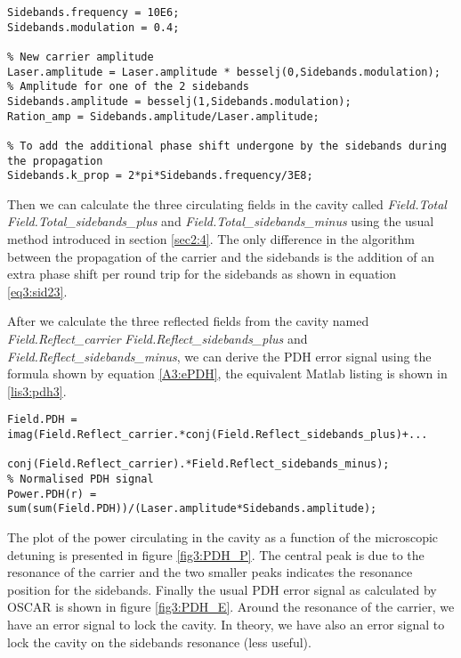 \begin{lstlisting}[float=btp,caption=New variables to define the sidebands frequency and amplitude \label{lis3:SB},frame=lines]
% Frequency of the sidebands in Hertz and modulation index
Sidebands.frequency = 10E6;
Sidebands.modulation = 0.4;

% New carrier amplitude
Laser.amplitude = Laser.amplitude * besselj(0,Sidebands.modulation);
% Amplitude for one of the 2 sidebands
Sidebands.amplitude = besselj(1,Sidebands.modulation);
Ration_amp = Sidebands.amplitude/Laser.amplitude;

% To add the additional phase shift undergone by the sidebands during the propagation
Sidebands.k_prop = 2*pi*Sidebands.frequency/3E8;
\end{lstlisting}

Then we can calculate the three circulating fields in the cavity called \textsl{Field.Total} \textsl{Field.Total\_sidebands\_plus} and \textsl{Field.Total\_sidebands\_minus} using the usual method introduced in section \ref{sec2:4}. The only difference in the algorithm between the propagation of the carrier and the sidebands is the addition of an extra phase shift per round trip for the sidebands as shown in equation \ref{eq3:sid23}.

After we calculate the three reflected fields from the cavity named \textsl{Field.Reflect\_carrier} \textsl{Field.Reflect\_sidebands\_plus} and \textsl{Field.Reflect\_sidebands\_minus}, we can derive the PDH error signal using the formula shown by equation \ref{A3:ePDH}, the equivalent Matlab listing is shown in \ref{lis3:pdh3}.\\

\begin{lstlisting}[float=btp,caption=Calculating the PDH error signals from the fields reflected by the cavity \label{lis3:pdh3},frame=lines]
Field.PDH = imag(Field.Reflect_carrier.*conj(Field.Reflect_sidebands_plus)+...
            conj(Field.Reflect_carrier).*Field.Reflect_sidebands_minus);
% Normalised PDH signal
Power.PDH(r) = sum(sum(Field.PDH))/(Laser.amplitude*Sidebands.amplitude);
\end{lstlisting}

The plot of the power circulating in the cavity as a function of the microscopic detuning is presented in figure \ref{fig3:PDH_P}. The central peak is due to the resonance of the carrier and the two smaller peaks indicates the resonance position for the sidebands. Finally the usual PDH error signal as calculated by OSCAR is shown in figure \ref{fig3:PDH_E}. Around the resonance of the carrier, we have an error signal to lock the cavity. In theory, we have also an error signal to lock the cavity on the sidebands resonance (less useful).

